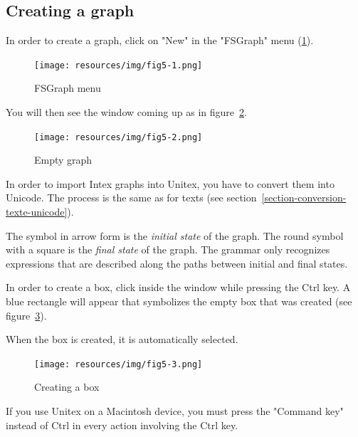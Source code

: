 \subsection{Creating a graph}
In order to create a graph, click on "New" in the "FSGraph" menu (\ref{fig-fsgraph-menu}).

\begin{figure}[!ht]
\begin{center}
\texttt{[image: resources/img/fig5-1.png]}
\caption{FSGraph menu\label{fig-fsgraph-menu}}
\end{center}
\end{figure}

\bigskip
\noindent You will then see the window coming up as in figure~\ref{fig-new-graph}.

\begin{figure}[!ht]
\begin{center}
\texttt{[image: resources/img/fig5-2.png]}
\caption{Empty graph\label{fig-new-graph}}
\end{center}
\end{figure}

\bigskip
\noindent In order to import Intex graphs into Unitex, you have to convert them into Unicode.
The process is the same as for texts (see section~\ref{section-conversion-texte-unicode}).

\bigskip
\noindent The symbol in
arrow form is the \textit{initial state} of the graph. The
round symbol with a square is the \textit{final state} of the
graph. The grammar only recognizes expressions that are
described along the paths between initial and final states.

\bigskip
\noindent In order to create a box, click inside the window while pressing the Ctrl
key.
A blue rectangle will appear that symbolizes the empty box that was created (see
figure~\ref{fig-box-creation}).

\bigskip
\noindent When the box is created, it is automatically selected. 

\begin{figure}[!ht]
\begin{center}
\texttt{[image: resources/img/fig5-3.png]}
\caption{Creating a box\label{fig-box-creation}}
\end{center}
\end{figure}

\bigskip
\noindent If you use Unitex on a Macintosh device, you must press the "Command key" 
instead of Ctrl in every action involving the Ctrl key.

